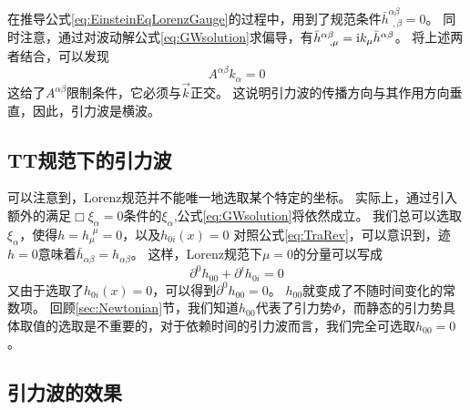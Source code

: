 在推导公式\ref{eq:EinsteinEqLorenzGauge}的过程中，用到了规范条件$\bar{h}^{\alpha\beta}_{~~,\beta} = 0$。
同时注意，通过对波动解公式\ref{eq:GWsolution}求偏导，有$\bar{h}^{\alpha\beta}_{~~ ,\mu} = {\rm i}k_\mu \bar{h}^{\alpha\beta}$。
将上述两者结合，可以发现
\begin{equation}\label{eq:Transverse} 
  A^{\alpha\beta} k_\alpha  = 0
\end{equation}
这给了$A^{\alpha\beta} $限制条件，它必须与$\vec{k}$正交。
这说明引力波的传播方向与其作用方向垂直，因此，引力波是横波。

\subsection{TT规范下的引力波}
可以注意到，Lorenz规范并不能唯一地选取某个特定的坐标。
实际上，通过引入额外的满足$\Box \xi_\alpha = 0$条件的$\xi_\alpha$,公式\ref{eq:GWsolution}将依然成立。
我们总可以选取$\xi_\alpha$，使得$h = h_\mu^{\,~\mu}= 0$，以及$h_{0i}(x)=0$
对照公式\ref{eq:TraRev}，可以意识到，迹$h=0$意味着$\bar{h}_{\alpha\beta}=h_{\alpha\beta}$。
这样，Lorenz规范下$\mu=0$的分量可以写成
\begin{equation}\label{eq:Lorenz0} 
  \partial^0 h_{00} +\partial^i h_{0i}= 0
\end{equation}
又由于选取了$h_{0i}(x)=0$，可以得到$\partial^0 h_{00} = 0$。
$h_{00}$就变成了不随时间变化的常数项。
回顾\ref{sec:Newtonian}节，我们知道$h_{00}$代表了引力势$\Phi$，而静态的引力势具体取值的选取是不重要的，对于依赖时间的引力波而言，我们完全可选取$h_{00}=0$。


\subsection{引力波的效果}
